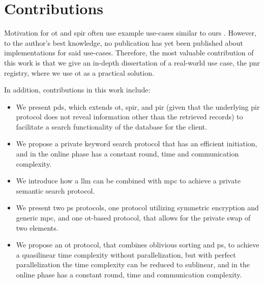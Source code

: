 \section{Contributions}
\label{sec:contributions}

Motivation for \acrfull{ot} and \acrfull{spir} often use example use-cases similar to ours \cite{AC:LLMNW17}. However, to the author's best knowledge, no publication has yet been published about implementations for said use-cases. Therefore, the most valuable contribution of this work is that we give an in-depth dissertation of a real-world use case, the \acrshort{pnr} registry, where we use \acrshort{ot} as a practical solution.

\hfill

\noindent
In addition, contributions in this work include:

\begin{itemize}
    \item We present \acrfull{pds}, which extends \acrshort{ot}, \acrshort{spir}, and \acrfull{pir} (given that the underlying \acrshort{pir} protocol does not reveal information other than the retrieved records) to facilitate a search functionality of the database for the client.
    \item We propose a private keyword search protocol that has an efficient initiation, and in the online phase has a constant round, time and communication complexity.
    \item We introduce how a \acrfull{llm} can be combined with \acrfull{mpc} to achieve a private semantic search protocol.
    \item We present two \acrfull{ps} protocols, one protocol utilizing symmetric encryption and generic \acrshort{mpc}, and one \acrshort{ot}-based protocol, that allows for the private swap of two elements.
    \item We propose an \acrshort{ot} protocol, that combines oblivious sorting and \acrshort{ps}, to achieve a quasilinear time complexity without parallelization, but with perfect parallelization the time complexity can be reduced to sublinear, and in the online phase has a constant round, time and communication complexity.
\end{itemize}

